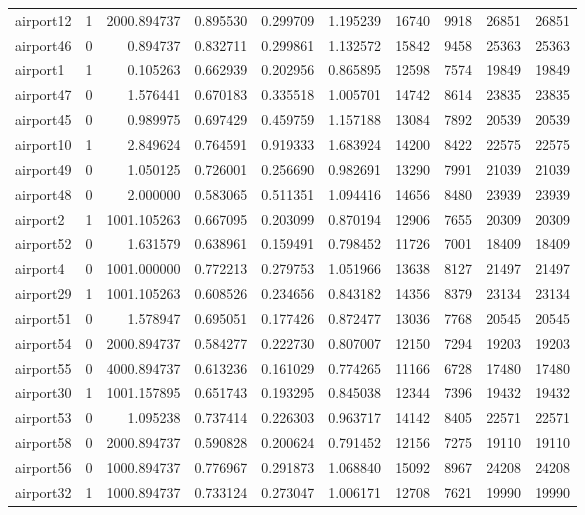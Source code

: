 \begin{longtable}{|l|r|r|r|r|r|r|r|r|r|}
airport12 & 1 & 2000.894737 & 0.895530 & 0.299709 & 1.195239 & 16740 & 9918 & 26851 & 26851 \\
airport46 & 0 & 0.894737 & 0.832711 & 0.299861 & 1.132572 & 15842 & 9458 & 25363 & 25363 \\
airport1 & 1 & 0.105263 & 0.662939 & 0.202956 & 0.865895 & 12598 & 7574 & 19849 & 19849 \\
airport47 & 0 & 1.576441 & 0.670183 & 0.335518 & 1.005701 & 14742 & 8614 & 23835 & 23835 \\
airport45 & 0 & 0.989975 & 0.697429 & 0.459759 & 1.157188 & 13084 & 7892 & 20539 & 20539 \\
airport10 & 1 & 2.849624 & 0.764591 & 0.919333 & 1.683924 & 14200 & 8422 & 22575 & 22575 \\
airport49 & 0 & 1.050125 & 0.726001 & 0.256690 & 0.982691 & 13290 & 7991 & 21039 & 21039 \\
airport48 & 0 & 2.000000 & 0.583065 & 0.511351 & 1.094416 & 14656 & 8480 & 23939 & 23939 \\
airport2 & 1 & 1001.105263 & 0.667095 & 0.203099 & 0.870194 & 12906 & 7655 & 20309 & 20309 \\
airport52 & 0 & 1.631579 & 0.638961 & 0.159491 & 0.798452 & 11726 & 7001 & 18409 & 18409 \\
airport4 & 0 & 1001.000000 & 0.772213 & 0.279753 & 1.051966 & 13638 & 8127 & 21497 & 21497 \\
airport29 & 1 & 1001.105263 & 0.608526 & 0.234656 & 0.843182 & 14356 & 8379 & 23134 & 23134 \\
airport51 & 0 & 1.578947 & 0.695051 & 0.177426 & 0.872477 & 13036 & 7768 & 20545 & 20545 \\
airport54 & 0 & 2000.894737 & 0.584277 & 0.222730 & 0.807007 & 12150 & 7294 & 19203 & 19203 \\
airport55 & 0 & 4000.894737 & 0.613236 & 0.161029 & 0.774265 & 11166 & 6728 & 17480 & 17480 \\
airport30 & 1 & 1001.157895 & 0.651743 & 0.193295 & 0.845038 & 12344 & 7396 & 19432 & 19432 \\
airport53 & 0 & 1.095238 & 0.737414 & 0.226303 & 0.963717 & 14142 & 8405 & 22571 & 22571 \\
airport58 & 0 & 2000.894737 & 0.590828 & 0.200624 & 0.791452 & 12156 & 7275 & 19110 & 19110 \\
airport56 & 0 & 1000.894737 & 0.776967 & 0.291873 & 1.068840 & 15092 & 8967 & 24208 & 24208 \\
airport32 & 1 & 1000.894737 & 0.733124 & 0.273047 & 1.006171 & 12708 & 7621 & 19990 & 19990 \\

\end{longtable}

